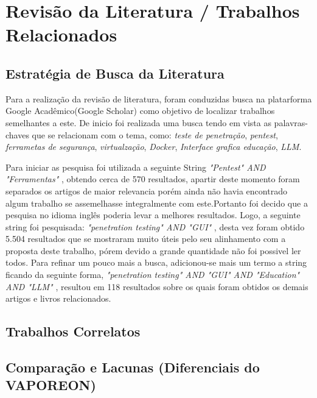 \chapter{Revisão da Literatura / Trabalhos Relacionados}
\label{sec:revisao}
\section{Estratégia de Busca da Literatura}
    Para a realização da revisão de literatura, foram conduzidas busca na platarforma 
    Google Acadêmico(Google Scholar) como objetivo de localizar trabalhos semelhantes 
    a este. De inicio foi realizada uma busca tendo em vista as palavras-chaves que se relacionam 
    com o tema, como: \textit{teste de penetração}, \textit{pentest}, \textit{ferrametas de segurança}, \textit{virtualzação}, 
    \textit{Docker}, \textit{Interface grafica educação}, \textit{LLM}.
     
    Para iniciar as pesquisa foi utilizada a seguinte String
    \textit{"Pentest" AND "Ferramentas" }, obtendo cerca de 570 resultados, apartir deste momento 
    foram separados os artigos de maior relevancia porém ainda não havia encontrado algum trabalho
    se assemelhasse integralmente com este.Portanto foi decido que a pesquisa no idioma inglês poderia levar
    a melhores resultados. Logo, a seguinte string foi pesquisada: \textit{"penetration testing" AND "GUI" }, desta vez 
    foram obtido 5.504 resultados que se mostraram muito úteis pelo seu alinhamento com a proposta deste trabalho, pórem devido a grande 
    quantidade não foi possivel ler todos. Para refinar um pouco mais a busca, adicionou-se mais um termo a string
    ficando da seguinte forma, \textit{"penetration testing" AND "GUI" AND "Education" AND "LLM" }, resultou em 118 resultados
    sobre os quais foram obtidos os demais artigos e livros relacionados.

\section{Trabalhos Correlatos}

\section{Comparação e Lacunas (Diferenciais do VAPOREON)}